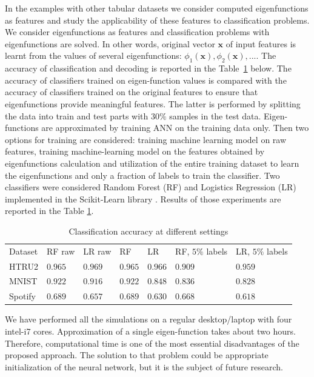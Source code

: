 \documentclass{article}
\theoremstyle{plain}
\theoremstyle{definition}
\theoremstyle{remark}
\begin{document}
In the examples with other tabular datasets we consider computed eigenfunctions as features and study
the applicability of these features to classification problems.
We consider eigenfunctions as features and classification problems with eigenfunctions are solved.
In other words, original vector $\mathbf{x} $ of input features is learnt from the values of several eigenfunctions:
$\phi_1(\mathbf{x}), \phi_2(\mathbf{x}), ... $.
The accuracy of classification and decoding is reported in the Table~\ref{tab:accuracy} below.
The accuracy of classifiers trained on eigen-function values is compared with the accuracy of classifiers
trained on the original features to ensure that eigenfunctions provide meaningful features.
The latter is performed by splitting the data into train and test parts with $30\%$ samples in the test data.
Eigen-functions are approximated by training ANN on the training data only.
Then two options for training are considered: training machine learning model on raw features,
training machine-learning model on the features obtained by eigenfunctions calculation and
utilization of the entire training dataset to learn the eigenfunctions and only a fraction of labels
to train the classifier. Two classifiers were considered Random Forest (RF) and Logistics Regression (LR)
implemented in the Scikit-Learn library \cite{scikit-learn}. Results of those experiments are reported
in the Table \ref{tab:accuracy}.

\begin{table}
  \caption{Classification accuracy at different settings}
  \label{tab:accuracy}
  \centering
  \begin{tabular}{lllllll}
    Dataset   & RF raw & LR raw & RF & LR & RF, $5\%$ labels & LR, $5\%$ labels \\
    HTRU2     &   $0.965$   &   $0.969$   &   $0.965$   &   $0.966$   &   $0.909$   &   $0.959$  \\
    MNIST     &   $0.922$   &   $0.916$   &   $0.922$   &   $0.848$   &   $0.836$   &   $0.828$  \\
    Spotify   &   $0.689$   &   $0.657$   &   $0.689$   &   $0.630$   &   $0.668$   &   $0.618$  \\
  \end{tabular}
\end{table}
We have performed all the simulations on a regular desktop/laptop with four intel-i7 cores.
Approximation of a single eigen-function takes about two hours.
Therefore, computational time is one of the most essential disadvantages of the proposed approach.
The solution to that problem could be appropriate initialization of the neural network,
but it is the subject of future research.
\end{document}
